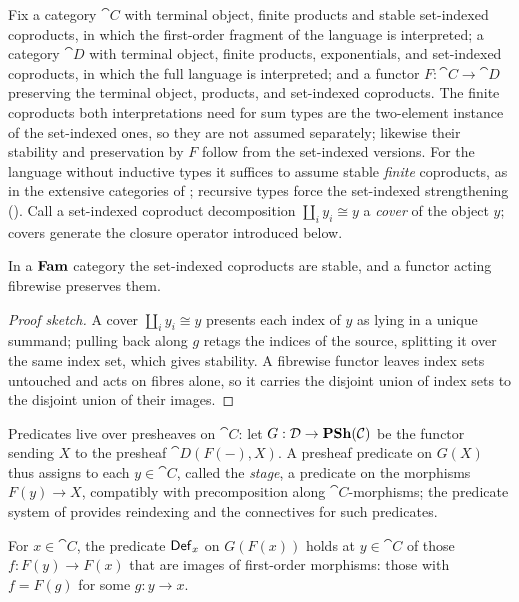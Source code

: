 Fix a category $\cat{C}$ with terminal object, finite products and stable set-indexed coproducts,
in which the first-order fragment of the language is interpreted; a category $\cat{D}$ with terminal
object, finite products, exponentials, and set-indexed coproducts, in which the full
language is interpreted; and a functor $F : \cat{C} \to \cat{D}$ preserving the terminal object,
products, and set-indexed coproducts. The finite coproducts both interpretations need for sum types
are the two-element instance of the set-indexed ones, so they are not assumed separately; likewise
their stability and preservation by $F$ follow from the set-indexed versions. For the
language without inductive types it suffices to assume stable \emph{finite} coproducts, as in the
extensive categories of \citet{fiore-simpson99}; recursive types force the set-indexed
strengthening (). Call a set-indexed coproduct decomposition
$\coprod_i y_i \cong y$ a \emph{cover} of the object $y$; covers generate the closure operator
introduced below.

\begin{lemma}
\label{lem:conservativity:fam-stable-coproducts}
In a $\mathbf{Fam}$ category the set-indexed coproducts are stable, and a functor acting fibrewise
preserves them.
\end{lemma}

\begin{proof}[Proof sketch]
A cover $\coprod_i y_i \cong y$ presents each index of $y$ as lying in a unique summand; pulling
back along $g$ retags the indices of the source, splitting it over the same index set, which gives
stability. A fibrewise functor leaves index sets untouched and acts on fibres alone, so it carries
the disjoint union of index sets to the disjoint union of their images.
\end{proof}

Predicates live over presheaves on $\cat{C}$: let $G : \mathcal{D} \to \mathbf{PSh}(\mathcal{C})$ be the functor
sending $X$ to the presheaf $\cat{D}(F(-), X)$. A presheaf predicate on $G(X)$ thus
assigns to each $y \in \cat{C}$, called the \emph{stage}, a predicate on the morphisms $F(y) \to X$, compatibly with
precomposition along $\cat{C}$-morphisms; the predicate system of  provides
reindexing and the connectives for such predicates.

\begin{definition}[Definability]
\label{def:conservativity:definable}
For $x \in \cat{C}$, the predicate $\mathsf{Def}_x$ on $G(F(x))$ holds at $y \in \cat{C}$ of those $f :
F(y) \to F(x)$ that are images of first-order morphisms: those with $f = F(g)$ for some $g : y \to x$.
\end{definition}


